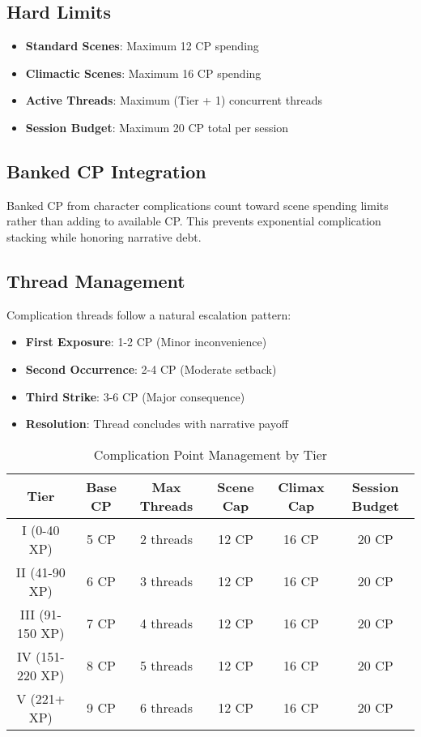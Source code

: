 \subsection{Hard Limits}
\begin{itemize}
    \item \textbf{Standard Scenes}: Maximum 12 CP spending
    \item \textbf{Climactic Scenes}: Maximum 16 CP spending
    \item \textbf{Active Threads}: Maximum (Tier + 1) concurrent threads
    \item \textbf{Session Budget}: Maximum 20 CP total per session
\end{itemize}

\subsection{Banked CP Integration}
Banked CP from character complications count toward scene spending limits rather than adding to available CP. This prevents exponential complication stacking while honoring narrative debt.

\subsection{Thread Management}
Complication threads follow a natural escalation pattern:
\begin{itemize}
    \item \textbf{First Exposure}: 1-2 CP (Minor inconvenience)
    \item \textbf{Second Occurrence}: 2-4 CP (Moderate setback)
    \item \textbf{Third Strike}: 3-6 CP (Major consequence)
    \item \textbf{Resolution}: Thread concludes with narrative payoff
\end{itemize}


\begin{table}[htbp]
\centering
\caption{Complication Point Management by Tier}
\begin{tabular}{|c|c|c|c|c|c|}
\hline
\textbf{Tier} & \textbf{Base CP} & \textbf{Max Threads} & \textbf{Scene Cap} & \textbf{Climax Cap} & \textbf{Session Budget} \\
\hline
I (0-40 XP) & 5 CP & 2 threads & 12 CP & 16 CP & 20 CP \\
II (41-90 XP) & 6 CP & 3 threads & 12 CP & 16 CP & 20 CP \\
III (91-150 XP) & 7 CP & 4 threads & 12 CP & 16 CP & 20 CP \\
IV (151-220 XP) & 8 CP & 5 threads & 12 CP & 16 CP & 20 CP \\
V (221+ XP) & 9 CP & 6 threads & 12 CP & 16 CP & 20 CP \\
\hline
\end{tabular}
\end{table}

